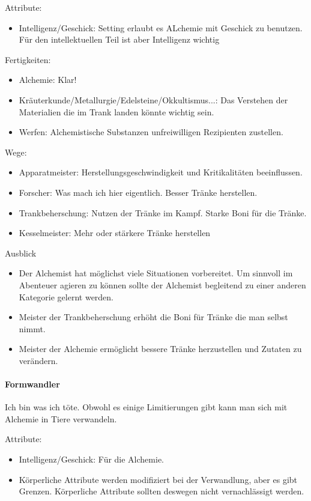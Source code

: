 \documentclass{article}
\begin{document}
Attribute:
\begin{itemize}
\item Intelligenz/Geschick: Setting erlaubt es ALchemie mit Geschick zu benutzen. Für den intellektuellen Teil ist aber Intelligenz wichtig
\end{itemize}

Fertigkeiten:
\begin{itemize}
\item Alchemie: Klar!
\item Kräuterkunde/Metallurgie/Edelsteine/Okkultismus...: Das Verstehen der Materialien die im Trank landen könnte wichtig sein.
\item Werfen: Alchemistische Substanzen unfreiwilligen Rezipienten zustellen.
\end{itemize}

Wege:
\begin{itemize}
\item Apparatmeister: Herstellungsgeschwindigkeit und Kritikalitäten beeinflussen.
\item Forscher: Was mach ich hier eigentlich. Besser Tränke herstellen.
\item Trankbeherschung: Nutzen der Tränke im Kampf. Starke Boni für die Tränke.
\item Kesselmeister: Mehr oder stärkere Tränke herstellen
\end{itemize}

Ausblick
\begin{itemize}
\item Der Alchemist hat möglichst viele Situationen vorbereitet. Um sinnvoll im Abenteuer agieren zu können sollte der Alchemist begleitend zu einer anderen Kategorie gelernt werden.
\item Meister der Trankbeherschung erhöht die Boni für Tränke die man selbst nimmt.
\item Meister der Alchemie ermöglicht bessere Tränke herzustellen und Zutaten zu verändern.
\end{itemize}

\paragraph{Formwandler}
Ich bin was ich töte. Obwohl es einige Limitierungen gibt kann man sich mit Alchemie in Tiere verwandeln.

Attribute:
\begin{itemize}
\item Intelligenz/Geschick: Für die Alchemie.
\item Körperliche Attribute werden modifiziert bei der Verwandlung, aber es gibt Grenzen. Körperliche Attribute sollten deswegen nicht vernachlässigt werden.
\end{itemize}
\end{document}
